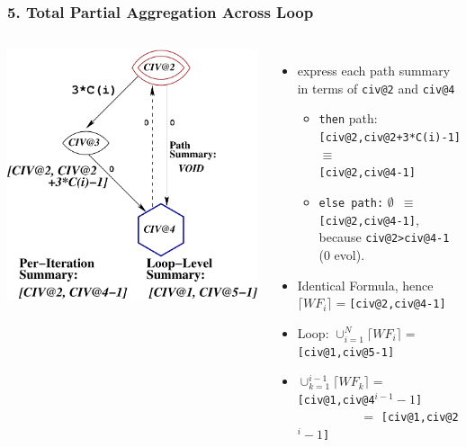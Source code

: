 \documentclass{beamer}
\newcommand{\emphh}[1]{\textcolor{CosGreen}{ #1}}
\begin{document}
\begin{frame}[fragile,t]
\frametitle{5. Total Partial Aggregation Across Loop}

\begin{columns}
\includegraphics[height=30ex]{Figures/VEG_CORREC.pdf}
\begin{itemize}
    \item[1] express each path summary in terms of {\tt civ@2} and {\tt civ@4}
    \begin{itemize}
        \item[a] {\tt then} path:\\
                    {\tt [civ@2,civ@2+3*C(i)-1]}$\equiv$\\
                    \emphh{{\tt[civ@2,civ@4-1]}}
        \item[b] {\tt else path:} {\tt $\emptyset$ $\equiv$ \emphh{[civ@2,civ@4-1]}},
                    because {\tt civ@2>civ@4-1} (0 evol).
    \end{itemize}\bigskip
    \item[2] Identical Formula, hence $\lceil WF_i \rceil = ${\tt [civ@2,civ@4-1]}\bigskip
    \item[3] Loop: $\cup_{i=1}^{N} \lceil WF_i \rceil = $ \emphh{\tt{}[civ@1,civ@5-1]}\pause\bigskip\bigskip\bigskip
    \item[4] $\cup_{k=1}^{i-1} \lceil WF_k \rceil = $ \emphh{\tt{}[civ@1,civ@4$^{i-1}-1$]}\\
             $\mbox{~~~~~~~~~~~~~~~}=$ \emphh{\tt{}[civ@1,civ@2$^{i}-1$]}
\end{itemize}
\end{columns}

\end{frame}
\end{document}
